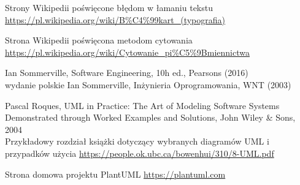 \documentclass[12pt,a4paper]{article}
\begin{document}
 Strony Wikipedii poświęcone błędom w łamaniu tekstu\\
\url{https://pl.wikipedia.org/wiki/B%C4%99kart_(typografia)}

 Strona Wikipedii poświęcona metodom cytowania \\
\url{https://pl.wikipedia.org/wiki/Cytowanie_pi%C5%9Bmiennictwa}

 Ian Sommerville, Software Engineering, 10h ed., Pearsons  (2016)\\
 wydanie polskie Ian Sommerville, Inżynieria Oprogramowania, WNT (2003)

 Pascal Roques, UML in Practice: The Art of Modeling Software Systems Demonstrated through Worked Examples and Solutions, John Wiley \& Sons, 2004\\
    Przykładowy rozdział książki dotyczący wybranych diagramów UML i przypadków użycia \url{https://people.ok.ubc.ca/bowenhui/310/8-UML.pdf}
    
 Strona domowa projektu PlantUML \url{https://plantuml.com}
\end{document}
